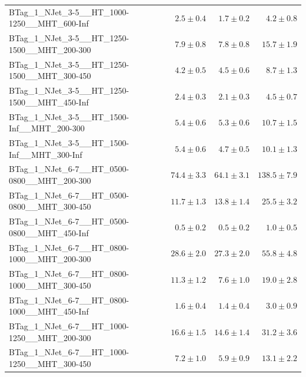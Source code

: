 \documentclass{beamer}
\begin{document}
\begin{frame}
\begin{tabular}{lrrr}
      BTag\_1\_NJet\_3-5\_\_HT\_1000-1250\_\_MHT\_600-Inf &               $2.5\pm0.4$&               $1.7\pm0.2$&                   $4.2\pm0.8$ \\
      BTag\_1\_NJet\_3-5\_\_HT\_1250-1500\_\_MHT\_200-300 &               $7.9\pm0.8$&               $7.8\pm0.8$&                  $15.7\pm1.9$ \\
      BTag\_1\_NJet\_3-5\_\_HT\_1250-1500\_\_MHT\_300-450 &               $4.2\pm0.5$&               $4.5\pm0.6$&                   $8.7\pm1.3$ \\
      BTag\_1\_NJet\_3-5\_\_HT\_1250-1500\_\_MHT\_450-Inf &               $2.4\pm0.3$&               $2.1\pm0.3$&                   $4.5\pm0.7$ \\
       BTag\_1\_NJet\_3-5\_\_HT\_1500-Inf\_\_MHT\_200-300 &               $5.4\pm0.6$&               $5.3\pm0.6$&                  $10.7\pm1.5$ \\
       BTag\_1\_NJet\_3-5\_\_HT\_1500-Inf\_\_MHT\_300-Inf &               $5.4\pm0.6$&               $4.7\pm0.5$&                  $10.1\pm1.3$ \\
      BTag\_1\_NJet\_6-7\_\_HT\_0500-0800\_\_MHT\_200-300 &              $74.4\pm3.3$&              $64.1\pm3.1$&                 $138.5\pm7.9$ \\
      BTag\_1\_NJet\_6-7\_\_HT\_0500-0800\_\_MHT\_300-450 &              $11.7\pm1.3$&              $13.8\pm1.4$&                  $25.5\pm3.2$ \\
      BTag\_1\_NJet\_6-7\_\_HT\_0500-0800\_\_MHT\_450-Inf &               $0.5\pm0.2$&               $0.5\pm0.2$&                   $1.0\pm0.5$ \\
      BTag\_1\_NJet\_6-7\_\_HT\_0800-1000\_\_MHT\_200-300 &              $28.6\pm2.0$&              $27.3\pm2.0$&                  $55.8\pm4.8$ \\
      BTag\_1\_NJet\_6-7\_\_HT\_0800-1000\_\_MHT\_300-450 &              $11.3\pm1.2$&               $7.6\pm1.0$&                  $19.0\pm2.8$ \\
      BTag\_1\_NJet\_6-7\_\_HT\_0800-1000\_\_MHT\_450-Inf &               $1.6\pm0.4$&               $1.4\pm0.4$&                   $3.0\pm0.9$ \\
      BTag\_1\_NJet\_6-7\_\_HT\_1000-1250\_\_MHT\_200-300 &              $16.6\pm1.5$&              $14.6\pm1.4$&                  $31.2\pm3.6$ \\
      BTag\_1\_NJet\_6-7\_\_HT\_1000-1250\_\_MHT\_300-450 &               $7.2\pm1.0$&               $5.9\pm0.9$&                  $13.1\pm2.2$ \\

\end{tabular}
\end{frame}
\end{document}
